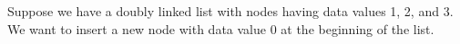 \documentclass[preview]{standalone}
\begin{document}
Suppose we have a doubly linked list with nodes having data values 1, 2, and 3. We want to insert a new node with data value 0 at the beginning of the list.\\
\end{document}
